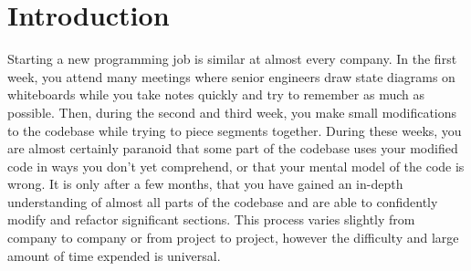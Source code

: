 \chapter{Introduction}


Starting a new programming job is similar at almost every company. In the first week, you attend many meetings where senior engineers draw state diagrams on whiteboards while you take notes quickly and try to remember as much as possible. Then, during the second and third week, you make small modifications to the codebase while trying to piece segments together. During these weeks, you are almost certainly paranoid that some part of the codebase uses your modified code in ways you don't yet comprehend, or that your mental model of the code is wrong. It is only after a few months, that you have gained an in-depth understanding of almost all parts of the codebase and are able to confidently modify and refactor significant sections. This process varies slightly from company to company or from project to project, however the difficulty and large amount of time expended is universal. 


